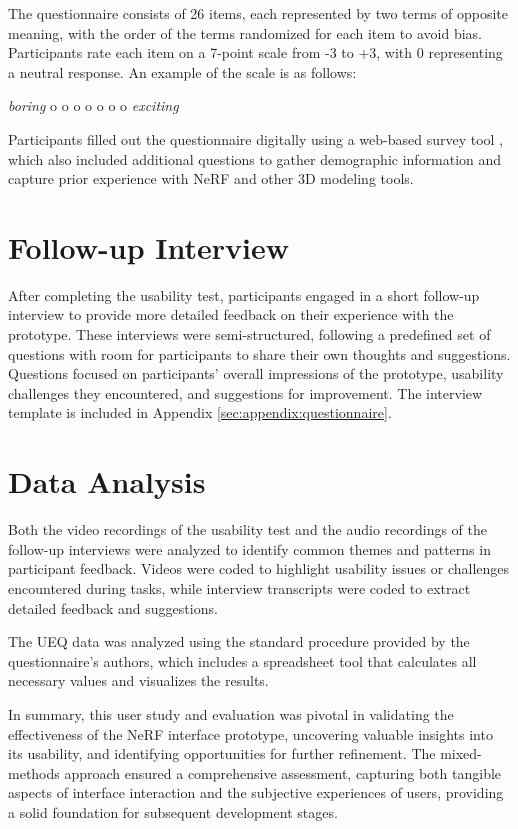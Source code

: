 The questionnaire consists of 26 items, each represented by two terms of opposite meaning, with the order of the terms randomized for each item to avoid bias.
Participants rate each item on a 7-point scale from -3 to +3, with 0 representing a neutral response.
An example of the scale is as follows:

\begin{center}
  \emph{boring} \quad o o o o o o o \quad \emph{exciting}
\end{center}

Participants filled out the questionnaire digitally using a web-based survey tool \cite{noauthor_sosci_nodate}, which also included additional questions to gather demographic information and capture prior experience with NeRF and other 3D modeling tools.

\section{Follow-up Interview}
\label{sec:study:interview}

After completing the usability test, participants engaged in a short follow-up interview to provide more detailed feedback on their experience with the prototype.
These interviews were semi-structured, following a predefined set of questions with room for participants to share their own thoughts and suggestions.
Questions focused on participants' overall impressions of the prototype, usability challenges they encountered, and suggestions for improvement.
The interview template is included in Appendix \ref{sec:appendix:questionnaire}.

\section{Data Analysis}
\label{sec:study:analysis}

Both the video recordings of the usability test and the audio recordings of the follow-up interviews were analyzed to identify common themes and patterns in participant feedback.
Videos were coded to highlight usability issues or challenges encountered during tasks, while interview transcripts were coded to extract detailed feedback and suggestions.

The UEQ data was analyzed using the standard procedure provided by the questionnaire's authors, which includes a spreadsheet tool that calculates all necessary values and visualizes the results.

In summary, this user study and evaluation was pivotal in validating the effectiveness of the NeRF interface prototype, uncovering valuable insights into its usability, and identifying opportunities for further refinement.
The mixed-methods approach ensured a comprehensive assessment, capturing both tangible aspects of interface interaction and the subjective experiences of users, providing a solid foundation for subsequent development stages.
